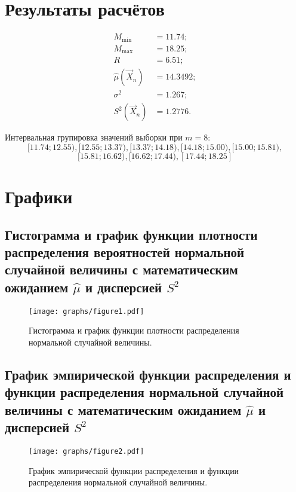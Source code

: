 
\section{Результаты расчётов}

\begin{align*}
    M_{\min} &= 11.74; \\
    M_{\max} &= 18.25; \\
    R &= 6.51; \\
    \hat{\mu}(\vec{X}_n) &= 14.3492; \\
    \sigma^2 &= 1.267; \\
    S^2(\vec{X}_n) &= 1.2776.
\end{align*}

\noindent 
Интервальная групировка значений выборки при $m = 8$:
\[
    [11.74;12.55), [12.55;13.37), [13.37;14.18), [14.18;15.00), [15.00;15.81),
\]
\[
    [15.81;16.62), [16.62;17.44), [17.44;18.25]
\]



\section{Графики}

\subsection{Гистограмма и график функции плотности распределения вероятностей нормальной случайной величины с математическим ожиданием $\hat{\mu}$ и дисперсией $S^2$}


\begin{figure}[h]
    \centering
    \texttt{[image: graphs/figure1.pdf]}
    \caption{Гистограмма и график функции плотности распределения нормальной случайной величины.}
\end{figure}



\newpage
\subsection{График эмпирической функции распределения и функции распределения нормальной случайной величины с математическим ожиданием $\hat{\mu}$ и дисперсией $S^2$}

\begin{figure}[h]
    \centering
    \texttt{[image: graphs/figure2.pdf]}
    \caption{График эмпирической функции распределения и функции распределения нормальной случайной величины.}
\end{figure}